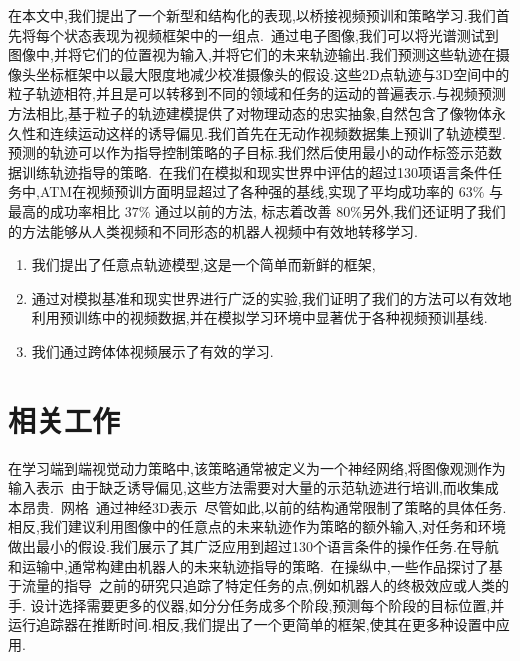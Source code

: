 \documentclass[conference]{IEEEtran}
\begin{document}
在本文中,我们提出了一个新型和结构化的表现,以桥接视频预训和策略学习.我们首先将每个状态表现为视频框架中的一组点.~通过电子图像,我们可以将光谱测试到图像中,并将它们的位置视为输入,并将它们的未来轨迹输出.我们预测这些轨迹在摄像头坐标框架中以最大限度地减少校准摄像头的假设.这些2D点轨迹与3D空间中的粒子轨迹相符,并且是可以转移到不同的领域和任务的运动的普遍表示.与视频预测方法相比,基于粒子的轨迹建模提供了对物理动态的忠实抽象,自然包含了像物体永久性和连续运动这样的诱导偏见.我们首先在无动作视频数据集上预训了轨迹模型. 预测的轨迹可以作为指导控制策略的子目标.我们然后使用最小的动作标签示范数据训练轨迹指导的策略.~\cite{karaev2023cotracker}在我们在模拟和现实世界中评估的超过130项语言条件任务中,ATM在视频预训方面明显超过了各种强的基线,实现了平均成功率的 $63\%$ 与最高的成功率相比 $37\%$ 通过以前的方法, 标志着改善 $80\%$另外,我们还证明了我们的方法能够从人类视频和不同形态的机器人视频中有效地转移学习.
\begin{enumerate}
  \item 我们提出了任意点轨迹模型,这是一个简单而新鲜的框架,
  \item 通过对模拟基准和现实世界进行广泛的实验,我们证明了我们的方法可以有效地利用预训练中的视频数据,并在模拟学习环境中显著优于各种视频预训基线.
  \item 我们通过跨体体视频展示了有效的学习.
\end{enumerate}

\section{相关工作}
在学习端到端视觉动力策略中,该策略通常被定义为一个神经网络,将图像观测作为输入表示~\cite{reed2022generalist,brohan2022rt,walke2023bridgedata}由于缺乏诱导偏见,这些方法需要对大量的示范轨迹进行培训,而收集成本昂贵.~\cite{qin2020keto,manuelli2020keypoints}网格~\cite{lin2021VCD,huang2022medor}通过神经3D表示~\cite{li20213d,rashid2023language}尽管如此,以前的结构通常限制了策略的具体任务.相反,我们建议利用图像中的任意点的未来轨迹作为策略的额外输入,对任务和环境做出最小的假设.我们展示了其广泛应用到超过130个语言条件的操作任务.在导航和运输中,通常构建由机器人的未来轨迹指导的策略.~\cite{aguiar2007trajectory,peng2018deepmimic}在操纵中,一些作品探讨了基于流量的指导~\cite{goyal2022ifor,seita2023toolflownet,gu2023rt}之前的研究只追踪了特定任务的点,例如机器人的终极效应或人类的手. \citet{vecerik2023robotap} 设计选择需要更多的仪器,如分分任务成多个阶段,预测每个阶段的目标位置,并运行追踪器在推断时间.相反,我们提出了一个更简单的框架,使其在更多种设置中应用.
\end{document}

